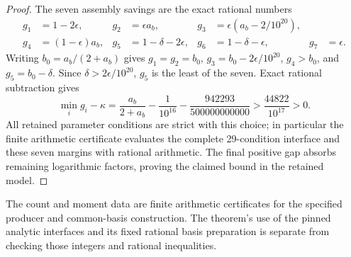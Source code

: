 \begin{proof}
The seven assembly savings are the exact rational numbers
\[
\begin{aligned}
 g_1&=1-2\epsilon,&g_2&=\epsilon a_b,&
 g_3&=\epsilon(a_b-2/10^{20}),\\
 g_4&=(1-\epsilon)a_b,&g_5&=1-\delta-2\epsilon,&
 g_6&=1-\delta-\epsilon,&g_7&=\epsilon.
\end{aligned}
\]
Writing $b_0=a_b/(2+a_b)$ gives $g_1=g_2=b_0$,
$g_3=b_0-2\epsilon/10^{20}$, $g_4>b_0$,
and $g_5=b_0-\delta$. Since $\delta>2\epsilon/10^{20}$,
$g_5$ is the least of the seven. Exact rational subtraction gives
\[
 \min_i g_i-\kappa
 =\frac{a_b}{2+a_b}-\frac1{10^{16}}
       -\frac{942293}{500000000000}
 >\frac{44822}{10^{17}}>0.
\]
All retained parameter conditions are strict with this choice; in
particular the finite arithmetic certificate evaluates the complete
29-condition interface and these seven margins with rational arithmetic.
The final positive gap absorbs remaining logarithmic factors, proving
the claimed bound in the retained model.
\end{proof}

The count and moment data are finite arithmetic certificates for the
specified producer and common-basis construction. The theorem's use of
the pinned analytic interfaces and its fixed rational basis preparation
is separate from checking those integers and rational inequalities.
